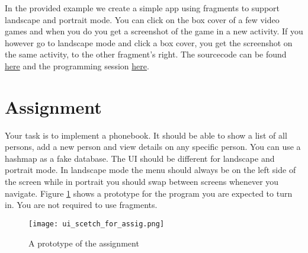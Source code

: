 In the provided example we create a simple app using fragments to support landscape and portrait mode. You can click on the box cover of a few video games and when you do you get a screenshot of the game in a new activity. If you however go to landscape mode and click a box cover, you get the screenshot on the same activity, to the other fragment's right. The sourcecode can be found \href{https://github.com/JonSteinn/AndroidDevelopment/tree/master/examples/lab3/fragments}{here} and the programming session \href{https://youtu.be/O4Wtgpx9Lv8}{here}.

\section{Assignment}
Your task is to implement a phonebook. It should be able to show a list of all persons, add a new person and view details on any specific person. You can use a hashmap as a fake database. The UI should be different for landscape and portrait mode. In landscape mode the menu should always be on the left side of the screen while in portrait you should swap between screens whenever you navigate. Figure \ref{fig:scetch} shows a prototype for the program you are expected to turn in. You are not required to use fragments.

\begin{figure}[H]
\centering
\texttt{[image: ui\_scetch\_for\_assig.png]}
\caption{A prototype of the assignment}
\label{fig:scetch}
\end{figure}